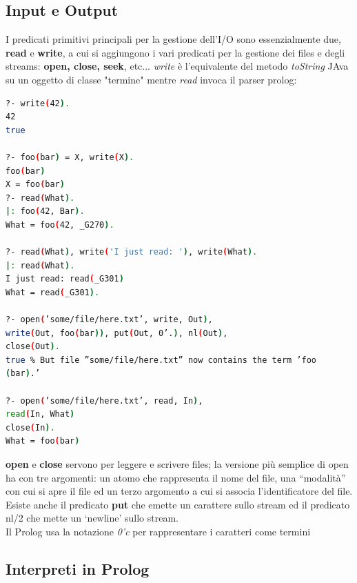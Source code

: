 \documentclass[a4paper,12pt, oneside]{book}
\begin{document}
\subsection{Input e Output}
I predicati primitivi principali per la gestione dell'I/O sono
essenzialmente due, \textbf{read} e \textbf{write}, a cui si aggiungono i vari predicati per la gestione dei files e degli streams: \textbf{open, close, seek}, etc...
\textit{write} è l'equivalente del metodo \textit{toString} JAva su un oggetto di classe "termine" mentre \textit{read} invoca il parser prolog:
\begin{shaded}
\begin{lstlisting}[language=bash]
?- write(42).
42
true

?- foo(bar) = X, write(X).
foo(bar)
X = foo(bar)
?- read(What).
|: foo(42, Bar).
What = foo(42, _G270).

?- read(What), write('I just read: '), write(What).
|: read(What).
I just read: read(_G301)
What = read(_G301).

?- open(’some/file/here.txt’, write, Out),
write(Out, foo(bar)), put(Out, 0’.), nl(Out),
close(Out).
true % But file ”some/file/here.txt” now contains the term ’foo
(bar).’

?- open(’some/file/here.txt’, read, In),
read(In, What)
close(In).
What = foo(bar)
\end{lstlisting}
\end{shaded}
\textbf{open} e \textbf{close} servono per leggere e scrivere files; la versione più semplice di open ha con tre argomenti: un atomo che rappresenta il nome del file, una “modalità” con cui si apre il file ed un terzo argomento a cui si associa l’identificatore del file.\\
Esiste anche il predicato \textbf{put} che emette un carattere sullo stream ed il predicato nl/2 che mette un ‘newline’ sullo stream.\\
Il Prolog usa la notazione \textit{0'c} per rappresentare i caratteri come termini
\subsection{Interpreti in Prolog}
\end{document}
